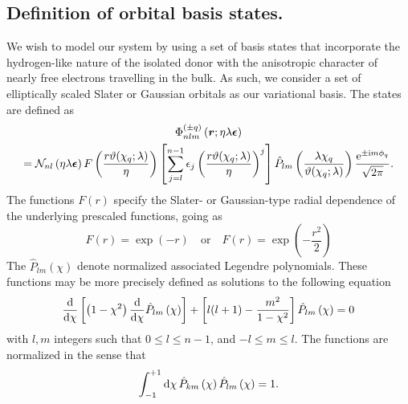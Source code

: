 \subsection{Definition of orbital basis states.}

We wish to model our system by using a set of basis states that
incorporate the hydrogen-like nature of the isolated donor with the
anisotropic character of nearly free electrons travelling in the
bulk. As such, we consider a set of elliptically scaled Slater or
Gaussian orbitals as our variational basis. The states are defined as
\begin{multline}
  \Phi_{nlm}^{(\pm q)}\left(\bm{r};\eta\lambda\bm{\epsilon}\right) \\
  = \mathcal{N}_{nl}\left(\eta\lambda\bm{\epsilon}\right)
  F\left(\frac{r\vartheta(\chi_q;\lambda)}{\eta}\right)
  \left[\sum_{j=l}^{n-1}
    \epsilon_{j}\left(\frac{r\vartheta(\chi_q;\lambda)}{\eta}\right)^{j}
    \right]
  \hat{P}_{lm}\left(\frac{\lambda \chi_{q}}{\vartheta(\chi_q;\lambda)}\right)
  \frac{\mathrm{e}^{\pm \mathrm{i} m \phi_q}}{\sqrt{2\pi}}.
\end{multline}
The functions $F(r)$ specify the Slater- or Gaussian-type radial
dependence of the underlying prescaled functions, going as
\begin{equation}
  F(r) = \exp\left(-r\right)
  \quad\mbox{or}\quad
  F(r) = \exp\left(-\frac{r^2}{2}\right)
\end{equation}
The $\hat{P}_{lm}\left(\chi\right)$ denote normalized associated
Legendre polynomials. These functions may be more precisely defined as
solutions to the following equation
\begin{equation}
  \frac{\mathrm{d}}{\mathrm{d} \chi}\left[
    \left(1-\chi^2\right)\frac{\mathrm{d}}{\mathrm{d} \chi}\hat{P}_{lm}\left(\chi\right)
    \right]
  +\left[l(l+1)-\frac{m^2}{1-\chi^2}\right]\hat{P}_{lm}\left(\chi\right)
  = 0
\end{equation}
with $l, m$ integers such that $0 \le l \le n - 1$, and $-l \le m \le
l$. The functions are normalized in the sense that
\begin{equation}
  \int_{-1}^{+1}\mathrm{d} \chi\,
  \hat{P}_{km}\left(\chi\right)\hat{P}_{lm}\left(\chi\right)
  = 1.
\end{equation}

